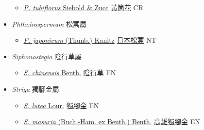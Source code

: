 \begin{itemize}
  \begin{itemize}
        \item[] \href{http://www.theplantlist.org/tpl1.1/search?q=Phacellanthus+tubiflorus}{\textit{P. tubiflorus} Siebold \& Zucc}   \href{\detokenize{http://taibnet.sinica.edu.tw/chi/taibnet_species_list.php?T2=黃筒花&T2_new_value=true&fr=y}}{黃筒花} CR
  \end{itemize}
 \item[] \textit{Phtheirospermum} 松蒿屬
                    
  \begin{itemize}
        \item[] \href{http://www.theplantlist.org/tpl1.1/search?q=Phtheirospermum+japonicum}{\textit{P. japonicum} (Thunb.) Kanitz}   \href{\detokenize{http://taibnet.sinica.edu.tw/chi/taibnet_species_list.php?T2=日本松蒿&T2_new_value=true&fr=y}}{日本松蒿} NT
  \end{itemize}
 \item[] \textit{Siphonostegia} 陰行草屬
                    
  \begin{itemize}
        \item[] \href{http://www.theplantlist.org/tpl1.1/search?q=Siphonostegia+chinensis}{\textit{S. chinensis} Benth.}   \href{\detokenize{http://taibnet.sinica.edu.tw/chi/taibnet_species_list.php?T2=陰行草&T2_new_value=true&fr=y}}{陰行草} EN
  \end{itemize}
 \item[] \textit{Striga} 獨腳金屬
                    
  \begin{itemize}
        \item[] \href{http://www.theplantlist.org/tpl1.1/search?q=Striga+lutea}{\textit{S. lutea} Lour.}   \href{\detokenize{http://taibnet.sinica.edu.tw/chi/taibnet_species_list.php?T2=獨腳金&T2_new_value=true&fr=y}}{獨腳金} EN
        \item[] \href{http://www.theplantlist.org/tpl1.1/search?q=Striga+masuria}{\textit{S. masuria} (Buch.-Ham. ex Benth.) Benth.}   \href{\detokenize{http://taibnet.sinica.edu.tw/chi/taibnet_species_list.php?T2=高雄獨腳金&T2_new_value=true&fr=y}}{高雄獨腳金} EN
  \end{itemize}
  \end{itemize}
